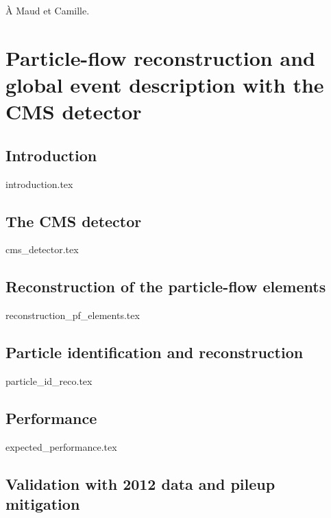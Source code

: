 \documentclass[11pt,twoside,a4paper,tdr]{cms-tdr}
\begin{document}
\newpage

\vspace*{10cm}
À Maud et Camille.

\pagebreak



\chapter{Particle-flow reconstruction and global event description with the CMS detector} 

\pagebreak 

\section{Introduction}
\label{sec:introduction}

{introduction.tex}

\section{The CMS detector }
\label{sec:cms_detector}

{cms_detector.tex}

\section{Reconstruction of the particle-flow elements}
\label{sec:reconstruction_pf_elements}

{reconstruction_pf_elements.tex}


\section{Particle identification and reconstruction}
\label{sec:particle_id_reco}

{particle_id_reco.tex}

\clearpage

\section{Performance}
\label{sec:expected_performance}

{expected_performance.tex}

\clearpage 

\section{Validation with 2012 data and pileup mitigation}
\label{sec:commissioning_and_pileup}
\end{document}
